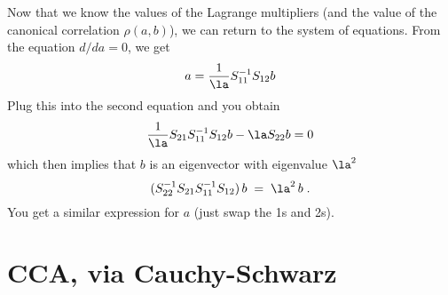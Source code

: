 \documentclass[12pt]{article}
\begin{document}
 Now that we know the values of the Lagrange multipliers (and the value of 
the canonical correlation $\rho(a,b)$), we can return to the
system of equations.  From the equation $d/da = 0$, we get
 \begin{displaymath}
    a = \frac{1}{\la} S_{11}^{-1} S_{12} b   
 \end{displaymath}
 Plug this into the second equation and you obtain
 \begin{displaymath}
   \frac{1}{\la} S_{21}S_{11}^{-1}S_{12} b - \la S_{22} b = 0
 \end{displaymath}
 which then implies that $b$ is an eigenvector with eigenvalue $\la^2$
 \begin{displaymath}
   (S_{22}^{-1} S_{21} S_{11}^{-1} S_{12}) \, b \; = \; \la^2 \, b \;.
 \end{displaymath}
 You get a similar expression for $a$ (just swap the 1s and 2s).


\section{CCA, via Cauchy-Schwarz}
\label{sec:ccacs}
\end{document}
